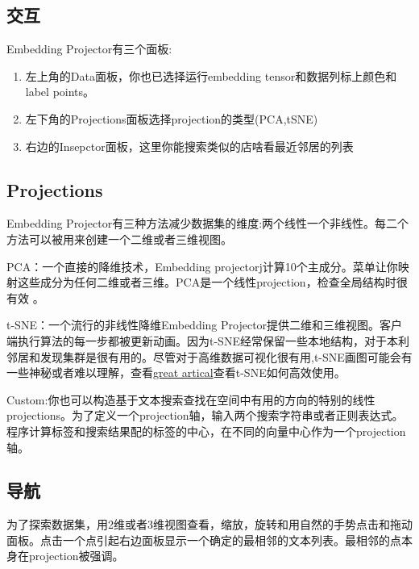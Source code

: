\subsection{交互}
Embedding Projector有三个面板:
\begin{enumerate}
	\item 左上角的Data面板，你也已选择运行embedding tensor和数据列标上颜色和label points。
	\item 左下角的Projections面板选择projection的类型(PCA,tSNE)
	\item 右边的Insepctor面板，这里你能搜索类似的店啥看最近邻居的列表
\end{enumerate}
\subsection{Projections}
Embedding Projector有三种方法减少数据集的维度:两个线性一个非线性。每二个方法可以被用来创建一个二维或者三维视图。

PCA：一个直接的降维技术，Embedding projectorj计算10个主成分。菜单让你映射这些成分为任何二维或者三维。PCA是一个线性projection，检查全局结构时很有效
。

t-SNE：一个流行的非线性降维Embedding Projector提供二维和三维视图。客户端执行算法的每一步都被更新动画。因为t-SNE经常保留一些本地结构，对于本利邻居和发现集群是很有用的。尽管对于高维数据可视化很有用,t-SNE画图可能会有一些神秘或者难以理解，查看\href{http://distill.pub/2016/misread-tsne/}{great artical}查看t-SNE如何高效使用。

Custom:你也可以构造基于文本搜索查找在空间中有用的方向的特别的线性projections。为了定义一个projection轴，输入两个搜索字符串或者正则表达式。程序计算标签和搜索结果配的标签的中心，在不同的向量中心作为一个projection轴。
\subsection{导航}
为了探索数据集，用2维或者3维视图查看，缩放，旋转和用自然的手势点击和拖动面板。点击一个点引起右边面板显示一个确定的最相邻的文本列表。最相邻的点本身在projection被强调。


